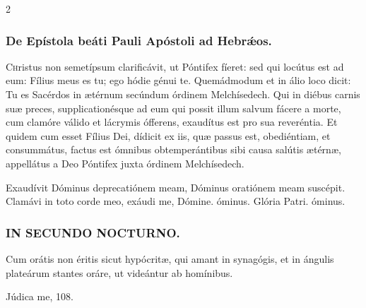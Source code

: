 \documentclass[9pt,twoside]{extarticle}
\begin{document}
\begin{multicols}{2}
\subsubsection*{\center De Epístola beáti Pauli Apóstoli ad Hebrǽos.}
\begin{center}\end{center}
\lettrine{C}hristus non semetípsum clarificávit, ut Póntifex fíeret: sed qui locútus est ad eum: Fílius meus es tu; ego hódie génui te. Quemádmodum et in álio loco dicit: Tu es Sacérdos in ætérnum secúndum órdinem Melchísedech. Qui in diébus carnis suæ preces, supplicationésque ad eum qui possit illum salvum fácere a morte, cum clamóre válido et lácrymis ófferens, exaudítus est pro sua reveréntia. Et quidem cum esset Fílius Dei, dídicit ex iis, quæ passus est, obediéntiam, et consummátus, factus est ómnibus obtemperántibus sibi causa salútis ætérnæ, appellátus a Deo Póntifex juxta órdinem Melchísedech.

\begin{tightlist}{}
\item {} Exaudívit Dóminus deprecatiónem meam, \textred{*} Dóminus oratiónem meam suscépit.  Clamávi in toto corde meo, exáudi me, Dómine. óminus. Glória Patri. óminus.
\end{tightlist}

\subsubsection*{\center \textsc{IN SECUNDO NOCTURNO.}}
\begin{tightlist}{}
\item {} Cum orátis non éritis sicut hypócritæ, qui amant in synagógis, et in ángulis plateárum stantes oráre, ut videántur ab homínibus.
\item {} Júdica me, 108.
\end{tightlist}

%
%
%
%
%
%
%


\end{multicols}
\end{document}

